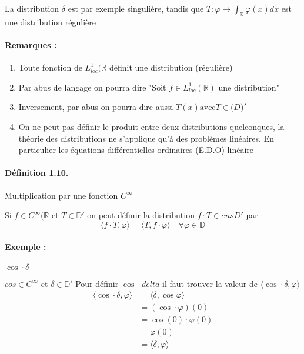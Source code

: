 \documentclass[12pt,a4paper]{report}
\newcommand{\Ens}[1]{\mathbb{#1}}
\newcommand{\ens}[1]{\mathbb{#1}}
\begin{document}
La distribution \(\delta\) est par exemple singulière, tandis que \(T : \varphi \rightarrow \int_{\Ens{R}} \varphi(x) dx\) est une distribution régulière

\paragraph{Remarques :}
\begin{enumerate}
	\item Toute fonction de \(L^1_{loc}(\ens{R}\) définit une distribution (régulière)
	\item Par abus de langage on pourra dire "Soit \(f \in L^1_{loc} (\ens{R})\) une distribution"
	\item Inversement, par abus on pourra dire aussi \(T(x) \text{avec} T \in \ens(D)'\)
	\item On ne peut pas définir le produit entre deux distributions quelconques, la théorie des distributions ne s'applique qu'à des problèmes linéaires. En particulier les équations différentielles ordinaires (E.D.O) linéaire
\end{enumerate}

\paragraph{Définition 1.10.} Multiplication par une fonction \(C^{\infty}\)

Si \(f \in C^{\infty}(\ens{R} \) et \(T\in \ens{D}'\) on peut définir la distribution \(f\cdot T \in ens{D}'\) par :
\[
	\langle f\cdot T, \varphi \rangle = \langle T, f\cdot \varphi \rangle \quad \forall \varphi \in \ens{D}
\]

\paragraph{Exemple :} \(\cos \cdot \delta\)

\(cos \in C^{\infty}\) et \(\delta \in \ens{D}'\)
Pour définir \(\cos \cdot delta\) il faut trouver la valeur de \(\langle \cos \cdot \delta, \varphi \rangle\)
\begin{align*}
	\langle \cos \cdot \delta, \varphi \rangle &= \langle \delta, \cos \varphi \rangle\\
	&= (\cos \cdot \varphi)(0)\\
	&= \cos(0) \cdot \varphi(0)\\
	&= \varphi (0)\\
	&= \langle \delta, \varphi \rangle
\end{align*}
\end{document}
